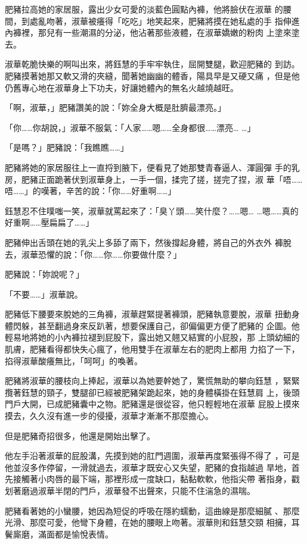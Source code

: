 肥豬拉高她的家居服，露出少女可愛的淡藍色圓點內褲，他將臉伏在淑華
的腰間，到處亂吻著，淑華被癢得「吃吃」地笑起來，肥豬將摸在她私處的手
指伸進內褲裡，那兒有一些潮濕的分泌，他沾著那些液體，在淑華嬌嫩的粉肉
上塗來塗去。

淑華乾脆快樂的啊叫出來，將鈺慧的手牢牢執住，屈開雙腿，歡迎肥豬的
到訪。肥豬摸著她那又軟又滑的夾縫，聞著她幽幽的體香，陽具早是又硬又痛
，但是他仍舊專心地在淑華身上下功夫，好讓她體內的無名火越燒越旺。

「啊，淑華，」肥豬讚美的說：「妳全身大概是肚臍最漂亮。」

「你……你胡說，」淑華不服氣：「人家……嗯……全身都很……漂亮…
…」

「是嗎？」肥豬說：「我瞧瞧……」

肥豬將她的家居服往上一直捋到腋下，便看見了她那雙青春逼人、渾圓彈
手的乳房，肥豬正面跪著伏到淑華身上，一手一個，揉完了搓，搓完了捏，淑
華「唔……唔……」的嘆著，辛苦的說：「你……好重啊……」

鈺慧忍不住噗嗤一笑，淑華就罵起來了：「臭丫頭……笑什麼？……嗯…
…嗯……真的好重啊……壓扁扁了……」

肥豬伸出舌頭在她的乳尖上多舔了兩下，然後撐起身體，將自己的外衣外
褲脫去，淑華恐懼的說：「你……你……你要做什麼？」

肥豬說：「妳說呢？」

「不要……」淑華說。

肥豬低下腰要來脫她的三角褲，淑華趕緊提著褲頭，肥豬執意要脫，淑華
扭動身體閃躲，甚至翻過身來反趴著，想要保護自己，卻偏偏更方便了肥豬的
企圖。他輕易地將她的小內褲拉褪到屁股下，露出她又翹又結實的小屁股，那
上頭幼細的肌膚，肥豬看得都快失心瘋了，他用雙手在淑華左右的肥肉上都用
力掐了一下，掐得淑華酸癢無比，「呵呵」的喚著。

肥豬將淑華的腰枝向上捧起，淑華以為她要幹她了，驚慌無助的攀向鈺慧
，緊緊攬著鈺慧的頸子，雙腿卻已經被肥豬架跪起來，她的身體橫掛在鈺慧肩
上，後頭門戶大開，已成肥豬囊中之物。肥豬還是很從容，他只輕輕地在淑華
屁股上摸來摸去，久久沒有進一步的侵擾，淑華才漸漸不那麼擔心。

但是肥豬奇招很多，他還是開始出擊了。

他左手沿著淑華的屁股溝，先摸到她的肛門週圍，淑華再度緊張得不得了
，可是他並沒多作停留，一滑就過去，淑華才既安心又失望，肥豬的食指越過
旱地，首先接觸著小肉唇的最下端，那裡形成一度缺口，黏黏軟軟，他指尖帶
著指身，戳划著磨過淑華半閉的門戶，淑華發不出聲來，只能不住湍急的濕喘。

肥豬看著她的小蠻腰，她因為短促的呼吸在隱約蠕動，這曲線是那麼細膩
、那麼光滑、那麼可愛，他彎下身體，在她的腰眼上吻著。淑華則和鈺慧交頸
相擁，耳鬢廝磨，滿面都是愉悅表情。

